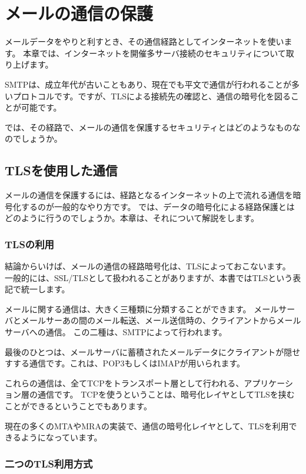 \chapter{メールの通信の保護}

メールデータをやりと利すとき、その通信経路としてインターネットを使います。
本章では、インターネットを開催多サーバ接続のセキュリティについて取り上げます。

SMTPは、成立年代が古いこともあり、現在でも平文で通信が行われることが多いプロトコルです。ですが、TLSによる接続先の確認と、通信の暗号化を図ることが可能です。


では、その経路で、メールの通信を保護するセキュリティとはどのようなものなのでしょうか。


\section{TLSを使用した通信}

メールの通信を保護するには、経路となるインターネットの上で流れる通信を暗号化するのが一般的なやり方です。
では、データの暗号化による経路保護とはどのように行うのでしょうか。本章は、それについて解説をします。

\subsection{TLSの利用}

結論からいけば、メールの通信の経路暗号化は、TLSによっておこないます。
一般的には、SSL/TLSとして扱われることがありますが、本書ではTLSという表記で統一します。

メールに関する通信は、大きく三種類に分類することができます。
メールサーバとメールサーあの間のメール転送、メール送信時の、クライアントからメールサーバへの通信。
この二種は、SMTPによって行われます。

最後のひとつは、メールサーバに蓄積されたメールデータにクライアントが隠せすする通信です。これは、POP3もしくはIMAPが用いられます。

これらの通信は、全てTCPをトランスポート層として行われる、アプリケーション層の通信です。
TCPを使うということは、暗号化レイヤとしてTLSを挟むことができるということでもあります。

現在の多くのMTAやMRAの実装で、通信の暗号化レイヤとして、TLSを利用できるようになっています。

\subsection{二つのTLS利用方式}

